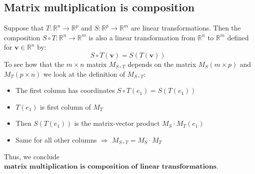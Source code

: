 \documentclass[a4paper, 9pt]{extarticle}
\begin{document}
\subsection*{Matrix multiplication is composition}
Suppose that $T:\mathbb{R}^n \to \mathbb{R}^p$ and $S:\mathbb{R}^p \to \mathbb{R}^m$ are linear transformations. Then the composition $S \circ T: \mathbb{R}^n \to \mathbb{R}^m$ is also a linear transformation from $\mathbb{R}^n$ to $\mathbb{R}^m$ defined for $\mathbf{v} \in \mathbb{R}^n$ by:
$$
  S \circ T(\mathbf{v}) = S(T(\mathbf{v}))
$$
To see how that the $m \times n$ matrix $M_{S\circ T}$ depends on the matrix $M_S (m \times p)$ and $M_T (p \times n)$ we look at the definition of $M_{S\circ T}$:
\begin{itemize}
  \item The first column has coordinates $S\circ T(e_1) = S(T(e_1))$
  \item $T(e_1)$ is first column of $M_T$
  \item Then $S(T(e_1))$ is the matrix-vector product $M_S \cdot M_T(e_1)$
  \item Same for all other columns $\Longrightarrow$ $M_{S\circ T} = M_S \cdot M_T$
\end{itemize}
Thus, we conclude $\textbf{matrix multiplication is composition of linear transformations}$.
\end{document}
